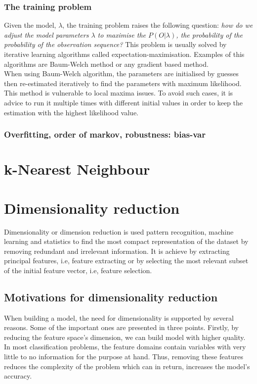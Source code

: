 \subsubsection{The training problem}
Given the model, \(\lambda\), the training problem raises the following question: \textit{how do we adjust the model parameters \(\lambda\) to maximise the \(P(O|\lambda)\), the probability of the probability of the observation sequence?}
This problem is usually solved by iterative learning algorithms called expectation-maximisation. Examples of this algorithms are Baum-Welch method or any gradient based method. %
\\When using Baum-Welch algorithm, the parameters are initialised by guesses then re-estimated iteratively to find the parameters with maximum likelihood.
This method is vulnerable to local maxima issues. To avoid such cases, it is advice to run it multiple times with different initial values in order to keep the estimation with the highest likelihood value.

\subsubsection{Overfitting, order of markov, robustness: bias-var}

\section{k-Nearest Neighbour}

\section{Dimensionality reduction}
Dimensionality or dimension reduction is used pattern recognition, machine learning and statistics to find the most compact representation of the dataset by removing redundant and irrelevant information.
It is achieve by extracting principal features, i.e, feature extracting or by selecting the most relevant subset of the initial feature vector, i.e, feature selection.

\subsection{Motivations for dimensionality reduction}
When building a model, the need for dimensionality is supported by several reasons. Some of the important ones are presented in three points.
Firstly, by reducing the feature space's dimension, we can build model with higher quality. %
In most classification problems, the feature domains contain variables with very little to no information for the purpose at hand.
Thus, removing these features reduces the complexity of the problem which can in return, increases the model's accuracy.

